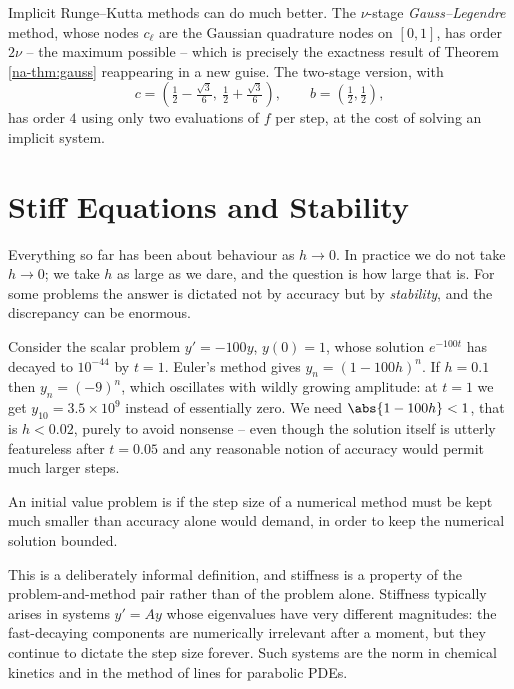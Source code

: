 \begin{remark}
  Implicit Runge--Kutta methods can do much better. The $\nu$-stage \emph{Gauss--Legendre} method, whose nodes $c_\ell$ are the Gaussian quadrature nodes on $[0,1]$, has order $2\nu$ -- the maximum possible -- which is precisely the exactness result of Theorem \ref{na-thm:gauss} reappearing in a new guise. The two-stage version, with
  $$
  c = \left(\tfrac12 - \tfrac{\sqrt3}{6},\ \tfrac12 + \tfrac{\sqrt3}{6}\right), \qquad b = \left(\tfrac12, \tfrac12\right),
  $$
  has order $4$ using only two evaluations of $f$ per step, at the cost of solving an implicit system.
\end{remark}


\section{Stiff Equations and Stability}\label{sec:stiff}

Everything so far has been about behaviour as $h \to 0$. In practice we do not take $h \to 0$; we take $h$ as large as we dare, and the question is how large that is. For some problems the answer is dictated not by accuracy but by \emph{stability}, and the discrepancy can be enormous.

\begin{example}
  Consider the scalar problem $y' = -100y$, $y(0) = 1$, whose solution $e^{-100t}$ has decayed to $10^{-44}$ by $t = 1$. Euler's method gives $y_n = (1-100h)^n$. If $h = 0.1$ then $y_n = (-9)^n$, which oscillates with wildly growing amplitude: at $t=1$ we get $y_{10} = 3.5\times 10^{9}$ instead of essentially zero. We need $\abs{1 - 100h} < 1$, that is $h < 0.02$, purely to avoid nonsense -- even though the solution itself is utterly featureless after $t = 0.05$ and any reasonable notion of accuracy would permit much larger steps.
\end{example}

\begin{definition}[Stiffness]
  An initial value problem is  if the step size of a numerical method must be kept much smaller than accuracy alone would demand, in order to keep the numerical solution bounded.
\end{definition}

This is a deliberately informal definition, and stiffness is a property of the problem-and-method pair rather than of the problem alone. Stiffness typically arises in systems $y' = Ay$ whose eigenvalues have very different magnitudes: the fast-decaying components are numerically irrelevant after a moment, but they continue to dictate the step size forever. Such systems are the norm in chemical kinetics and in the method of lines for parabolic PDEs.

